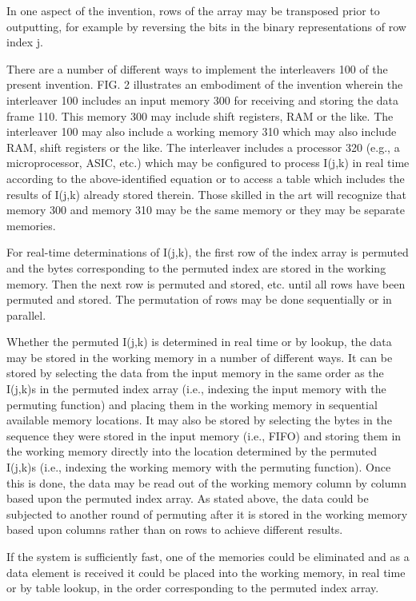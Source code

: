 \documentclass[11pt,a4paper]{article}
\begin{document}
In one aspect of the invention, rows of the array may be transposed prior to outputting, for example by reversing the bits in the binary representations of row index j.

There are a number of different ways to implement the interleavers 100 of the present invention. FIG. 2 illustrates an embodiment of the invention wherein the interleaver 100 includes an input memory 300 for receiving and storing the data frame 110. This memory 300 may include shift registers, RAM or the like. The interleaver 100 may also include a working memory 310 which may also include RAM, shift registers or the like. The interleaver includes a processor 320 (e.g., a microprocessor, ASIC, etc.) which may be configured to process I(j,k) in real time according to the above-identified equation or to access a table which includes the results of I(j,k) already stored therein. Those skilled in the art will recognize that memory 300 and memory 310 may be the same memory or they may be separate memories.

For real-time determinations of I(j,k), the first row of the index array is permuted and the bytes corresponding to the permuted index are stored in the working memory. Then the next row is permuted and stored, etc. until all rows have been permuted and stored. The permutation of rows may be done sequentially or in parallel.

Whether the permuted I(j,k) is determined in real time or by lookup, the data may be stored in the working memory in a number of different ways. It can be stored by selecting the data from the input memory in the same order as the I(j,k)s in the permuted index array (i.e., indexing the input memory with the permuting function) and placing them in the working memory in sequential available memory locations. It may also be stored by selecting the bytes in the sequence they were stored in the input memory (i.e., FIFO) and storing them in the working memory directly into the location determined by the permuted I(j,k)s (i.e., indexing the working memory with the permuting function). Once this is done, the data may be read out of the working memory column by column based upon the permuted index array. As stated above, the data could be subjected to another round of permuting after it is stored in the working memory based upon columns rather than on rows to achieve different results.

If the system is sufficiently fast, one of the memories could be eliminated and as a data element is received it could be placed into the working memory, in real time or by table lookup, in the order corresponding to the permuted index array.
\end{document}
